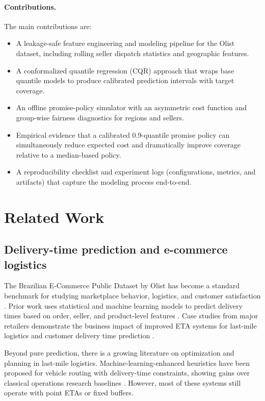 \documentclass[10pt,twocolumn]{article}
\begin{document}
\paragraph{Contributions.}
The main contributions are:
\begin{itemize}
  \item A leakage-safe feature engineering and modeling pipeline for the Olist dataset, including rolling seller dispatch statistics and geographic features.
  \item A conformalized quantile regression (CQR) approach that wraps base quantile models to produce calibrated prediction intervals with target coverage.
  \item An offline promise-policy simulator with an asymmetric cost function and group-wise fairness diagnostics for regions and sellers.
  \item Empirical evidence that a calibrated 0.9-quantile promise policy can simultaneously reduce expected cost and dramatically improve coverage relative to a median-based policy.
  \item A reproducibility checklist and experiment logs (configurations, metrics, and artifacts) that capture the modeling process end-to-end.
\end{itemize}

\section{Related Work}
\subsection{Delivery-time prediction and e-commerce logistics}
The Brazilian E-Commerce Public Dataset by Olist has become a standard benchmark for studying marketplace behavior, logistics, and customer satisfaction \citep{olistdataset}. Prior work uses statistical and machine learning models to predict delivery times based on order, seller, and product-level features \citep{brunilogistics2023,rokoss2024deliverytime}. Case studies from major retailers demonstrate the business impact of improved ETA systems for last-mile logistics and customer delivery time prediction \citep{walmart2019cdt,kardinal2025lastmile}.

Beyond pure prediction, there is a growing literature on optimization and planning in last-mile logistics. Machine-learning-enhanced heuristics have been proposed for vehicle routing with delivery-time constraints, showing gains over classical operations research baselines \citep{brunilogistics2023}. However, most of these systems still operate with point ETAs or fixed buffers.
\end{document}

